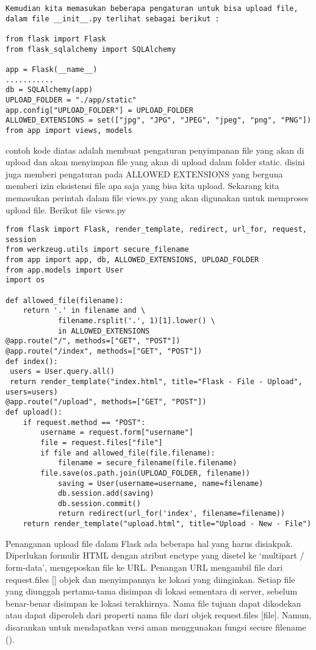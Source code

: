 \documentclass[12pt,a4paper]{article}
\begin{document}
\begin{verbatim}
Kemudian kita memasukan beberapa pengaturan untuk bisa upload file, 
dalam file __init__.py terlihat sebagai berikut :

from flask import Flask
from flask_sqlalchemy import SQLAlchemy

app = Flask(__name__)
...........
db = SQLAlchemy(app)
UPLOAD_FOLDER = "./app/static"
app.config["UPLOAD_FOLDER"] = UPLOAD_FOLDER
ALLOWED_EXTENSIONS = set(["jpg", "JPG", "JPEG", "jpeg", "png", "PNG"])
from app import views, models
\end{verbatim}

contoh kode diatas adalah membuat pengaturan penyimpanan file yang akan di upload dan akan menyimpan file yang akan di upload dalam folder static. disini juga memberi pengaturan pada ALLOWED EXTENSIONS yang berguna memberi izin eksistensi file apa saja yang bisa kita upload.
Sekarang kita memasukan perintah dalam file views.py yang akan digunakan untuk memproses upload file. Berikut file views.py
\begin{verbatim}
from flask import Flask, render_template, redirect, url_for, request, session
from werkzeug.utils import secure_filename
from app import app, db, ALLOWED_EXTENSIONS, UPLOAD_FOLDER
from app.models import User
import os

def allowed_file(filename):
    return '.' in filename and \
            filename.rsplit('.', 1)[1].lower() \
            in ALLOWED_EXTENSIONS
@app.route("/", methods=["GET", "POST"])
@app.route("/index", methods=["GET", "POST"])
def index():
 users = User.query.all()
 return render_template("index.html", title="Flask - File - Upload", users=users)
@app.route("/upload", methods=["GET", "POST"])
def upload():
    if request.method == "POST":
        username = request.form["username"]
        file = request.files["file"]
        if file and allowed_file(file.filename):
            filename = secure_filename(file.filename)
        file.save(os.path.join(UPLOAD_FOLDER, filename))
            saving = User(username=username, name=filename)
            db.session.add(saving)
            db.session.commit()
            return redirect(url_for('index', filename=filename))
    return render_template("upload.html", title="Upload - New - File")
\end{verbatim}


Penanganan upload file dalam Flask ada beberapa hal yang harus disiakpak. Diperlukan formulir HTML dengan atribut enctype yang disetel ke ‘multipart / form-data’, mengeposkan file ke URL. Penangan URL mengambil file dari request.files [] objek dan menyimpannya ke lokasi yang diinginkan.
Setiap file yang diunggah pertama-tama disimpan di lokasi sementara di server, sebelum benar-benar disimpan ke lokasi terakhirnya. Nama file tujuan dapat dikodekan atau dapat diperoleh dari properti nama file dari objek request.files [file]. Namun, disarankan untuk mendapatkan versi aman menggunakan fungsi secure filename ().
\end{document}
